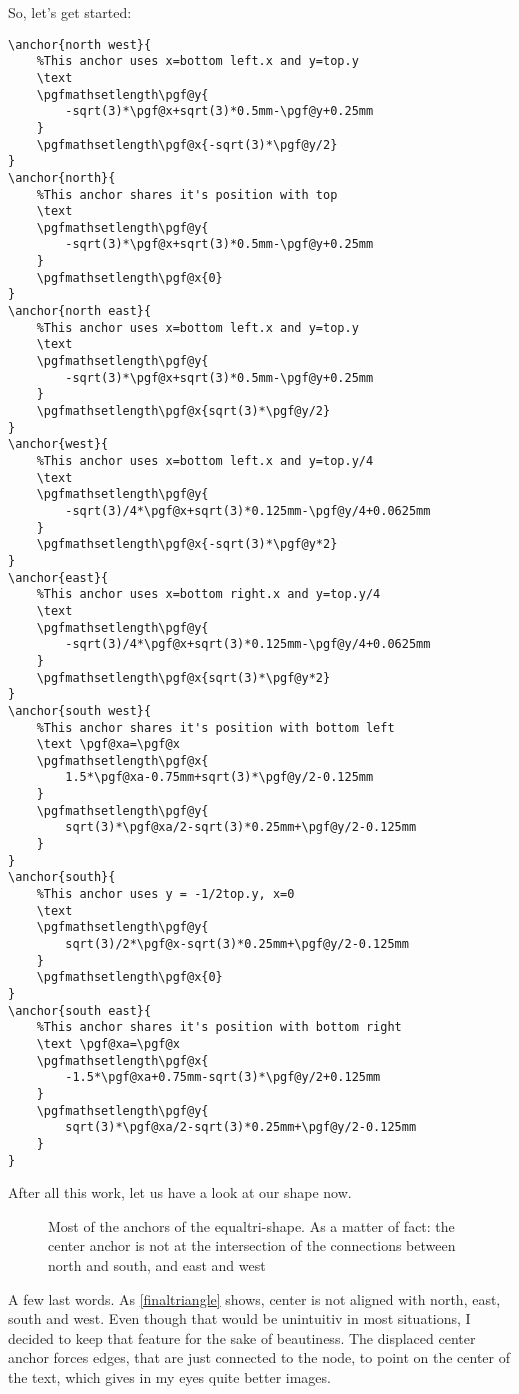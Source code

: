 \documentclass[12pt]{article}
\begin{document}
So, let's get started:
\begin{lstlisting}[caption=Making equaltri stable in TikZ,label=stabil]
\anchor{north west}{
	%This anchor uses x=bottom left.x and y=top.y
	\text
	\pgfmathsetlength\pgf@y{
		-sqrt(3)*\pgf@x+sqrt(3)*0.5mm-\pgf@y+0.25mm
	}
	\pgfmathsetlength\pgf@x{-sqrt(3)*\pgf@y/2}
}
\anchor{north}{
	%This anchor shares it's position with top
	\text
	\pgfmathsetlength\pgf@y{
		-sqrt(3)*\pgf@x+sqrt(3)*0.5mm-\pgf@y+0.25mm
	}
	\pgfmathsetlength\pgf@x{0}
}
\anchor{north east}{
	%This anchor uses x=bottom left.x and y=top.y
	\text
	\pgfmathsetlength\pgf@y{
		-sqrt(3)*\pgf@x+sqrt(3)*0.5mm-\pgf@y+0.25mm
	}
	\pgfmathsetlength\pgf@x{sqrt(3)*\pgf@y/2}
}
\anchor{west}{
	%This anchor uses x=bottom left.x and y=top.y/4
	\text
	\pgfmathsetlength\pgf@y{
		-sqrt(3)/4*\pgf@x+sqrt(3)*0.125mm-\pgf@y/4+0.0625mm
	}
	\pgfmathsetlength\pgf@x{-sqrt(3)*\pgf@y*2}
}
\anchor{east}{
	%This anchor uses x=bottom right.x and y=top.y/4
	\text
	\pgfmathsetlength\pgf@y{
		-sqrt(3)/4*\pgf@x+sqrt(3)*0.125mm-\pgf@y/4+0.0625mm
	}
	\pgfmathsetlength\pgf@x{sqrt(3)*\pgf@y*2}
}
\anchor{south west}{
	%This anchor shares it's position with bottom left
	\text \pgf@xa=\pgf@x
	\pgfmathsetlength\pgf@x{
		1.5*\pgf@xa-0.75mm+sqrt(3)*\pgf@y/2-0.125mm
	}
	\pgfmathsetlength\pgf@y{
		sqrt(3)*\pgf@xa/2-sqrt(3)*0.25mm+\pgf@y/2-0.125mm
	}
}
\anchor{south}{
	%This anchor uses y = -1/2top.y, x=0
	\text
	\pgfmathsetlength\pgf@y{
		sqrt(3)/2*\pgf@x-sqrt(3)*0.25mm+\pgf@y/2-0.125mm
	}
	\pgfmathsetlength\pgf@x{0}
}
\anchor{south east}{
	%This anchor shares it's position with bottom right
	\text \pgf@xa=\pgf@x
	\pgfmathsetlength\pgf@x{
		-1.5*\pgf@xa+0.75mm-sqrt(3)*\pgf@y/2+0.125mm
	}
	\pgfmathsetlength\pgf@y{
		sqrt(3)*\pgf@xa/2-sqrt(3)*0.25mm+\pgf@y/2-0.125mm
	}
}
\end{lstlisting}
After all this work, let us have a look at our shape now.
\begin{figure}[H]
\centering
{}
\caption{Most of the anchors of the equaltri-shape. As a matter of fact: the center anchor is not at the intersection of the connections between north and south, and east and west}\label{finaltriangle}
\end{figure}
\noindent A few last words. As \autoref{finaltriangle} shows, center is not aligned with north, east, south and west. Even though that would be unintuitiv in most situations, I decided to keep that feature for the sake of beautiness. The displaced center anchor forces edges, that are just connected to the node, to point on the center of the text, which gives in my eyes quite better images.
\clearpage
\end{document}
